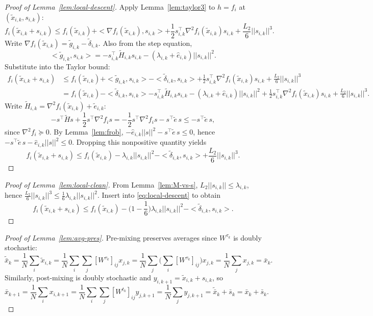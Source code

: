 \documentclass[11pt,a4paper]{article}
\def\norm#1{||#1||}%
\def\ip#1#2{<#1,#2>}%
\newcommand{\ip}[2]{\left\langle #1,#2\right\rangle}
\newcommand{\norm}[1]{\left\|#1\right\|}
\begin{document}
	\begin{proof}[Proof of Lemma~\ref{lem:local-descent}]
		Apply Lemma~\ref{lem:taylor3} to $h=f_i$ at $(\tilde x_{i,k},s_{i,k})$:
		\[
		f_i(\tilde x_{i,k}+s_{i,k})
		\le f_i(\tilde x_{i,k})+\ip{\nabla f_i(\tilde x_{i,k})}{s_{i,k}}
		+\frac12 s_{i,k}^\top\nabla^2 f_i(\tilde x_{i,k})s_{i,k}+\frac{L_2}{6}\norm{s_{i,k}}^3.
		\]
		Write $\nabla f_i(\tilde x_{i,k})=\tilde g_{i,k}-\tilde\delta_{i,k}$.
		Also from the step equation,
		\[
		\ip{\tilde g_{i,k}}{s_{i,k}}
		=-s_{i,k}^\top\tilde H_{i,k}s_{i,k}-(\lambda_{i,k}+\hat e_{i,k})\norm{s_{i,k}}^2.
		\]
		Substitute into the Taylor bound:
		\begin{align*}
			f_i(\tilde x_{i,k}+s_{i,k})
			&\le f_i(\tilde x_{i,k})
			+\ip{\tilde g_{i,k}}{s_{i,k}}-\ip{\tilde\delta_{i,k}}{s_{i,k}}
			+\frac12 s_{i,k}^\top\nabla^2 f_i(\tilde x_{i,k})s_{i,k}+\frac{L_2}{6}\norm{s_{i,k}}^3\\
			&= f_i(\tilde x_{i,k})
			-\ip{\tilde\delta_{i,k}}{s_{i,k}}
			-s_{i,k}^\top\tilde H_{i,k}s_{i,k}-(\lambda_{i,k}+\hat e_{i,k})\norm{s_{i,k}}^2
			+\frac12 s_{i,k}^\top\nabla^2 f_i(\tilde x_{i,k})s_{i,k}
			+\frac{L_2}{6}\norm{s_{i,k}}^3.
		\end{align*}
		Write $\tilde H_{i,k}=\nabla^2 f_i(\tilde x_{i,k})+\tilde e_{i,k}$:
		\[
		-s^\top\tilde H s + \frac12 s^\top\nabla^2 f_i s
		= -\frac12 s^\top\nabla^2 f_i s - s^\top \tilde e\, s \le - s^\top \tilde e\,s,
		\]
		since $\nabla^2 f_i\succeq 0$.
		By Lemma~\ref{lem:frob}, $-\hat e_{i,k}\norm{s}^2 - s^\top\tilde e\,s\le 0$, hence
		$- s^\top \tilde e\,s - \hat e_{i,k}\norm{s}^2 \le 0$.
		Dropping this nonpositive quantity yields
		\[
		f_i(\tilde x_{i,k}+s_{i,k})
		\le f_i(\tilde x_{i,k})
		-\lambda_{i,k}\norm{s_{i,k}}^2
		-\ip{\tilde\delta_{i,k}}{s_{i,k}}
		+\frac{L_2}{6}\norm{s_{i,k}}^3.
		\]
	\end{proof}
	
	\begin{proof}[Proof of Lemma~\ref{lem:local-clean}]
		From Lemma~\ref{lem:M-vs-s}, $L_2\norm{s_{i,k}}\le \lambda_{i,k}$, hence
		$\frac{L_2}{6}\norm{s_{i,k}}^3\le \frac{1}{6}\lambda_{i,k}\norm{s_{i,k}}^2$.
		Insert into \eqref{eq:local-descent} to obtain
		\[
		f_i(\tilde x_{i,k}+s_{i,k})
		\le f_i(\tilde x_{i,k})-\Big(1-\frac16\Big)\lambda_{i,k}\norm{s_{i,k}}^2-\ip{\tilde\delta_{i,k}}{s_{i,k}}.
		\]
	\end{proof}
	
	\begin{proof}[Proof of Lemma~\ref{lem:avg-pres}]
		Pre-mixing preserves averages since $W^{\tau_k}$ is doubly stochastic:
		\[
		\tilde{\bar x}_k=\frac1N\sum_i\tilde x_{i,k}
		=\frac1N\sum_i\sum_j [W^{\tau_k}]_{ij}x_{j,k}
		=\frac1N\sum_j \Big(\sum_i [W^{\tau_k}]_{ij}\Big)x_{j,k}
		=\frac1N\sum_j x_{j,k}=\bar x_k.
		\]
		Similarly, post-mixing is doubly stochastic and $y_{i,k+1}=\tilde x_{i,k}+s_{i,k}$, so
		\[
		\bar x_{k+1}=\frac1N\sum_i x_{i,k+1}
		=\frac1N\sum_i\sum_j[W^{t_k}]_{ij}y_{j,k+1}
		=\frac1N\sum_j y_{j,k+1}
		=\tilde{\bar x}_k+\bar s_k=\bar x_k+\bar s_k.
		\]
	\end{proof}
	
\end{document}
